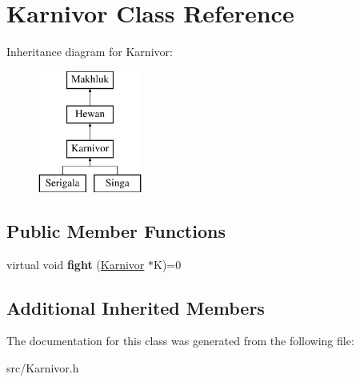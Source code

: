 \hypertarget{class_karnivor}{}\section{Karnivor Class Reference}
\label{class_karnivor}
Inheritance diagram for Karnivor\+:\begin{figure}[H]
\begin{center}
\leavevmode
\includegraphics[height=4.000000cm]{class_karnivor}
\end{center}
\end{figure}
\subsection*{Public Member Functions}
\begin{DoxyCompactItemize}
\item 
\hypertarget{class_karnivor_acf8679ded67721322af02c5e2e082562}{}virtual void {\bfseries fight} (\hyperlink{class_karnivor}{Karnivor} $\ast$K)=0\label{class_karnivor_acf8679ded67721322af02c5e2e082562}

\end{DoxyCompactItemize}
\subsection*{Additional Inherited Members}


The documentation for this class was generated from the following file\+:\begin{DoxyCompactItemize}
\item 
src/Karnivor.\+h\end{DoxyCompactItemize}
